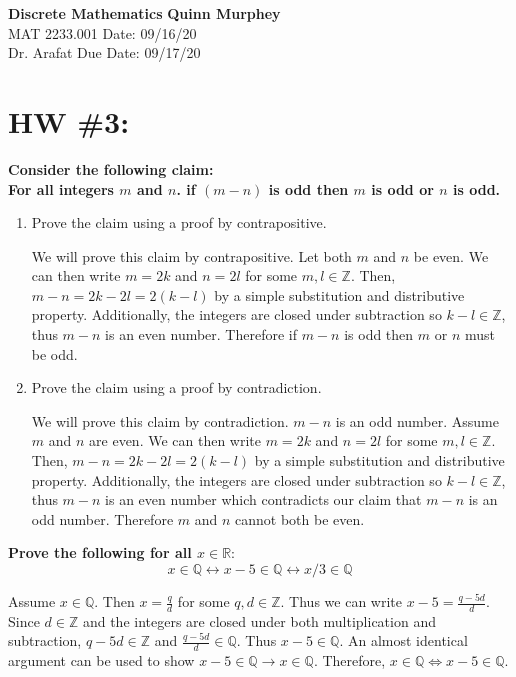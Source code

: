 \documentclass[letterpaper, 12pt]{article}
\begin{document}
\noindent\large\textbf{Discrete Mathematics} \hfill \textbf{Quinn Murphey} \\
\normalsize MAT 2233.001 \hfill Date: 09/16/20 \\
Dr. Arafat \hfill Due Date: 09/17/20 \\

\noindent\makebox[\linewidth]{\rule{\paperwidth}{0.4pt}}

\section*{HW \#3:}
\textbf{Consider the following claim:}\\
\textbf{For all integers $m$ and $n$. if $(m-n)$ is odd then $m$ is odd or $n$ is odd.}
\begin{enumerate}
    \item Prove the claim using a proof by contrapositive.
    
        We will prove this claim by contrapositive. Let both $m$ and $n$ be even. We can then write $m=2k$ and $n=2l$ for some $m,l\in\mathbb{Z}$. Then, $m - n = 2k - 2l = 2(k - l)$ by a simple substitution and distributive property. Additionally, the integers are closed under subtraction so $k-l\in\mathbb{Z}$, thus $m-n$ is an even number. Therefore if $m-n$ is odd then $m$ or $n$ must be odd.
    
    \item Prove the claim using a proof by contradiction.
    
        We will prove this claim by contradiction. $m-n$ is an odd number. Assume $m$ and $n$ are even. We can then write $m=2k$ and $n=2l$ for some $m,l\in\mathbb{Z}$. Then, $m - n = 2k - 2l = 2(k - l)$ by a simple substitution and distributive property. Additionally, the integers are closed under subtraction so $k-l\in\mathbb{Z}$, thus $m-n$ is an even number which contradicts our claim that $m-n$ is an odd number. Therefore $m$ and $n$ cannot both be even. 
\end{enumerate}

\noindent\textbf{Prove the following for all $x\in\mathbb{R}:$}
$$x\in\mathbb{Q}\leftrightarrow x-5\in\mathbb{Q} \leftrightarrow x/3\in\mathbb{Q}$$

Assume $x\in\mathbb{Q}$. Then $x = \frac{q}{d}$ for some $q,d\in\mathbb{Z}$. Thus we can write $x-5 = \frac{q - 5d}{d}$. Since $d\in\mathbb{Z}$ and the integers are closed under both multiplication and subtraction, $q-5d\in\mathbb{Z}$ and $\frac{q-5d}{d}\in\mathbb{Q}$. Thus $x-5\in\mathbb{Q}$. An almost identical argument can be used to show $x-5\in\mathbb{Q} \rightarrow x\in\mathbb{Q}$. Therefore, $x\in\mathbb{Q}\Leftrightarrow x-5\in\mathbb{Q}$.
\end{document}
